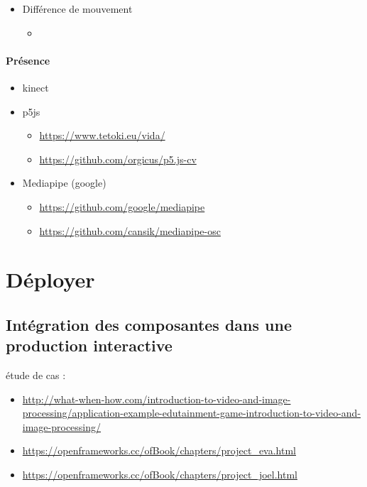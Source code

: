 \documentclass[
  french,
]{book}
\providecommand{\tightlist}{%
  \setlength{\itemsep}{0pt}\setlength{\parskip}{0pt}}
\begin{document}
\begin{itemize}
\tightlist
\item
  Différence de mouvement

  \begin{itemize}
  \tightlist
  \item
  \end{itemize}
\end{itemize}

\hypertarget{interagir_presence}{%
\subsubsection{Présence}\label{interagir_presence}}

\begin{itemize}
\item
  kinect
\item
  p5js

  \begin{itemize}
  \tightlist
  \item
    \url{https://www.tetoki.eu/vida/}
  \item
    \url{https://github.com/orgicus/p5.js-cv}
  \end{itemize}
\item
  Mediapipe (google)

  \begin{itemize}
  \tightlist
  \item
    \url{https://github.com/google/mediapipe}
  \item
    \url{https://github.com/cansik/mediapipe-osc}
  \end{itemize}
\end{itemize}

\hypertarget{deployer}{%
\chapter{Déployer}\label{deployer}}

\hypertarget{intuxe9gration-des-composantes-dans-une-production-interactive}{%
\section{Intégration des composantes dans une production interactive}\label{intuxe9gration-des-composantes-dans-une-production-interactive}}

étude de cas :

\begin{itemize}
\item
  \url{http://what-when-how.com/introduction-to-video-and-image-processing/application-example-edutainment-game-introduction-to-video-and-image-processing/}
\item
  \url{https://openframeworks.cc/ofBook/chapters/project_eva.html}
\item
  \url{https://openframeworks.cc/ofBook/chapters/project_joel.html}
\end{itemize}
\end{document}
